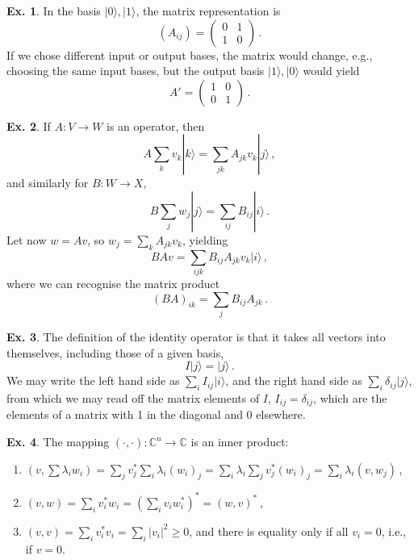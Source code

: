 \documentclass[a4paper,12pt]{article}
\theoremstyle{definition}
\newtheorem{exercise}{Ex.}[section]
\begin{document}
\begin{exercise} In the basis $|0\rangle, |1\rangle$, the matrix representation is
\[ (A_{ij}) = 
 \begin{pmatrix}
 0 & 1 \\ 1 & 0 
 \end{pmatrix}\,.
\]
If we chose different input or output bases, the matrix would change, e.g., choosing the same input bases, but the output basis $|1\rangle, |0\rangle$ would yield
\[
 A' = \begin{pmatrix} 1 & 0 \\ 0 & 1 \end{pmatrix}\,.
\]
\end{exercise}



\begin{exercise}
 If $A:V\to W$ is an operator, then
 \[
  A \sum_k v_k|k\rangle = \sum_{jk} A_{jk} v_k |j\rangle\,,
 \]
 and similarly for $B:W\to X$,
 \[
  B\sum_j w_j |j\rangle = \sum_{ij}B_{ij}|i\rangle\,.
 \]
 Let now $w=Av$, so $w_j = \sum_k A_{jk}v_k$, yielding
 \[
  B A v = \sum_{ijk} B_{ij}A_{jk}v_k |i\rangle\,,
 \]
 where we can recognise the matrix product
 \[
  (BA)_{ik} = \sum_j B_{ij}A_{jk}\,.
 \]
\end{exercise}

\begin{exercise}
 The definition of the identity operator is that it takes all vectors into themselves, including those of a given basis,
 \[
  I |j\rangle = |j\rangle\,.
 \]
We may write the left hand side as $\sum_i I_{ij}|i\rangle$, and the right hand side as $\sum_i \delta_{ij}|j\rangle$, from which we may read off the matrix elements of $I$, $I_{ij} = \delta_{ij}$, which are the elements of a matrix with 1 in the diagonal and 0 elsewhere.
\end{exercise}

\begin{exercise}
 The mapping $(\cdot,\cdot):\mathbb{C}^n\to\mathbb{C}$ is an inner product:
 \begin{enumerate}[(1)]
  \item $(v, \sum \lambda_i w_i) = \sum_j v_j^* \sum_i \lambda_i (w_i)_j =\sum_i\lambda_i\sum_j v_j^* (w_i)_j = \sum_i \lambda_i (v, w_j)$\,,
  \item $(v, w) = \sum_i v_i^* w_i = (\sum_i v_i w_i^*)^* = (w, v)^*$\,,
  \item $(v, v) = \sum_i v_i^* v_i = \sum_i |v_i|^2\ge 0$, and there is equality only if all $v_i=0$, i.e., if $v=0$.
 \end{enumerate}
\end{exercise}
\end{document}
